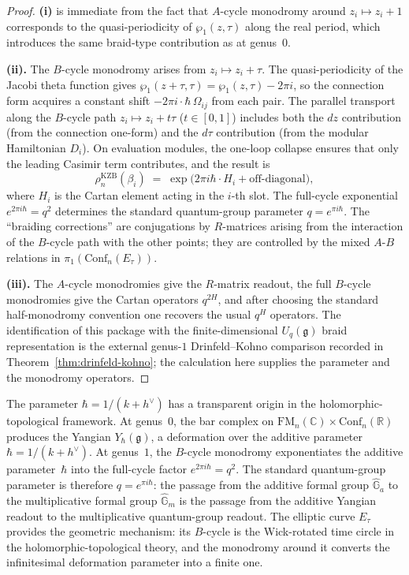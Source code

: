 \begin{proof}
\textbf{(i)} is immediate from the fact that $A$-cycle monodromy around
$z_i \mapsto z_i + 1$ corresponds to the quasi-periodicity of
$\wp_1(z,\tau)$ along the real period, which introduces the same
braid-type contribution as at genus~$0$.

\medskip
\noindent\textbf{(ii).}
The $B$-cycle monodromy arises from $z_i \mapsto z_i + \tau$. The
quasi-periodicity of the Jacobi theta function gives
$\wp_1(z + \tau, \tau) = \wp_1(z, \tau) - 2\pi i$, so the connection
form acquires a constant shift $-2\pi i \cdot \hbar\,\Omega_{ij}$
from each pair. The parallel transport along the
$B$-cycle path $z_i \mapsto z_i + t\tau$ ($t \in [0,1]$) includes
both the $dz$ contribution (from the connection one-form) and the
$d\tau$ contribution (from the modular Hamiltonian $D_i$). On
evaluation modules, the one-loop collapse ensures that only the
leading Casimir term contributes, and the result is
\[
\rho_n^{\mathrm{KZB}}(\beta_i)
\;=\;
\exp\bigl(2\pi i \hbar \cdot H_i + \text{off-diagonal}\bigr),
\]
where $H_i$ is the Cartan element acting in the $i$-th slot. The
full-cycle exponential $e^{2\pi i \hbar} = q^2$ determines the
standard quantum-group parameter $q = e^{\pi i\hbar}$. The
``braiding corrections'' are conjugations by
$R$-matrices arising from the interaction of the $B$-cycle path with
the other points; they are controlled by the mixed $A$-$B$ relations
in $\pi_1(\mathrm{Conf}_n(E_\tau))$.

\medskip
\noindent\textbf{(iii).}
The $A$-cycle monodromies give the $R$-matrix readout, the full
$B$-cycle monodromies give the Cartan operators $q^{2H}$, and after
choosing the standard half-monodromy convention one recovers the
usual $q^H$ operators. The identification of this package with the
finite-dimensional $U_q(\mathfrak g)$ braid representation is the
external genus-$1$ Drinfeld--Kohno comparison recorded in
Theorem~\ref{thm:drinfeld-kohno}; the calculation here supplies the
parameter and the monodromy operators.
\end{proof}

\begin{remark}
\label{rem:q-physical}
The parameter $\hbar = 1/(k+h^\vee)$
has a transparent origin in the holomorphic-topological framework.
At genus~$0$, the bar complex on $\mathrm{FM}_n(\mathbb{C}) \times
\mathrm{Conf}_n(\mathbb{R})$ produces the Yangian $Y_\hbar(\mathfrak{g})$,
a deformation over the additive parameter $\hbar = 1/(k + h^\vee)$.
At genus~$1$, the $B$-cycle monodromy exponentiates the additive
parameter~$\hbar$ into the full-cycle factor $e^{2\pi i\hbar}=q^2$.
The standard quantum-group parameter is therefore
$q = e^{\pi i \hbar}$: the passage from the additive formal group
$\widehat{\mathbb{G}}_a$ to the multiplicative formal group
$\widehat{\mathbb{G}}_m$ is the passage from the additive Yangian
readout to the multiplicative quantum-group readout. The elliptic
curve $E_\tau$ provides the geometric mechanism: its $B$-cycle is the
Wick-rotated time circle in the
holomorphic-topological theory, and the monodromy around it converts
the infinitesimal deformation parameter into a finite one.
\end{remark}

